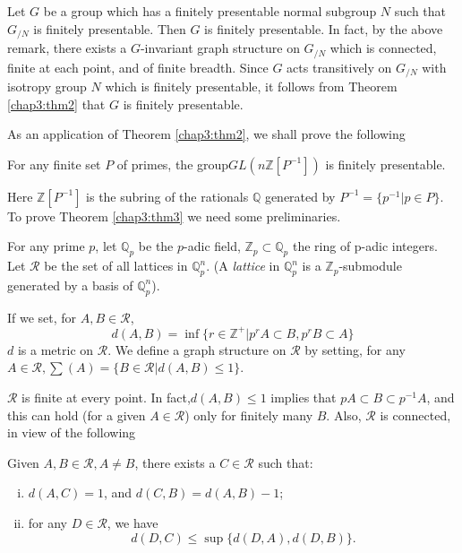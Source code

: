 \setcounter{rem}{1}
\begin{rem}%
  Let $G$ be a group which has a finitely presentable normal subgroup
  $N$ such that $G_{/N}$ is finitely presentable. Then $G$ is finitely
  presentable. In fact, by the above remark, there exists a $G$-invariant
  graph structure on $G_{/N}$  which is connected, finite at each point,
  and of finite breadth. Since $G$ acts transitively on $G_{/N}$  with
  isotropy group $N$ which is finitely presentable, it follows from
  Theorem \ref{chap3:thm2} that $G$ is finitely presentable. 
\end{rem}

As an application of Theorem \ref{chap3:thm2}, we shall prove the following

\begin{thm}\label{chap3:thm3}%
For any finite set $P$ of primes,
the group\break $GL(n \mathbb{Z}[P^{-1}])$ is finitely presentable. 

Here\pageoriginale
$\mathbb{Z}[P^{-1}]$ is the subring of the rationals $\mathbb{Q}$
generated by $P^{-1} = \{ p^{-1 }| p \in P \}$. To prove Theorem \ref{chap3:thm3}
we need some preliminaries. 

For any prime $p$, let $\mathbb{Q}_p$ be the $p$-adic field,
$\mathbb{Z}_p \subset \mathbb{Q}_p$ the ring of p-adic integers. Let
$\mathcal{R}$ be the set of all lattices in $\mathbb{Q}^n_p$. (A
\textit{lattice} in $\mathbb{Q}^n_p$ is a $\mathbb{Z}_p$-submodule
generated by a basis of $\mathbb{Q}^n_p$). 

If we set, for $A, B \in \mathcal{R}$,
$$
d(A,B)= \inf \{ r \in \mathbb{Z}^+ | p^r A \subset B, p^r B \subset A \}
$$
$d$ is a metric on $\mathcal{R}$. We define a graph structure on
$\mathcal{R}$ by setting, for any $A \in \mathcal{R}, \sum (A) = \{ B
\in \mathcal{R}| d(A,B)\leq 1 \}$. 

$\mathcal{R}$ is finite at every point. In fact,$d(A,B) \leq 1$
implies that $pA \subset B \subset p^{-1} A$, and this can hold (for a
given $A \in \mathcal{R}$) only for finitely many $B$. Also, 
$\mathcal{R}$ is connected, in view of the following
\end{thm}


\begin{prop*}
 Given $A, B \in \mathcal{R}, A  \neq B $, there
exists a $ C \in \mathcal{R}$ such that: 
\begin{enumerate}[(i)]
\item $d(A,C) =1$, and $d(C,B) = d(A,B)-1$;

\item for any $ D \in \mathcal{R}$, we have 
  $$
  d(D,C) \leq \sup \{ d(D,A), d(D,B)\}.
  $$
\end{enumerate}
\end{prop*}

